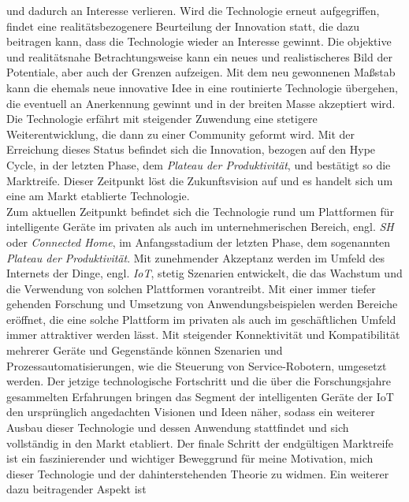     und dadurch an Interesse verlieren. Wird die Technologie erneut aufgegriffen, findet eine realitätsbezogenere 
    Beurteilung der Innovation statt, die dazu beitragen kann, dass die Technologie wieder an Interesse gewinnt. Die 
    objektive und realitätsnahe Betrachtungsweise kann ein neues und realistischeres Bild der Potentiale, aber auch 
    der Grenzen aufzeigen. Mit dem neu gewonnenen Maßstab kann die ehemals neue innovative Idee in eine routinierte Technologie übergehen, 
    die eventuell an Anerkennung gewinnt und in der breiten Masse akzeptiert wird. Die Technologie erfährt mit steigender 
    Zuwendung eine stetigere Weiterentwicklung, die dann zu einer Community geformt wird. Mit der Erreichung dieses Status 
    befindet sich die Innovation, bezogen auf den Hype Cycle, in der letzten Phase, dem \textit{Plateau der Produktivität}, 
    und bestätigt so die Marktreife. Dieser Zeitpunkt löst die Zukunftsvision auf und es handelt sich um eine am Markt 
    etablierte Technologie.
    \\ 
    \linebreak
    Zum aktuellen Zeitpunkt befindet sich die Technologie rund um Plattformen für intelligente Geräte im privaten als auch im unternehmerischen 
    Bereich, engl. \textit{\ac{SH}} oder \textit{Connected Home}, im Anfangsstadium der letzten Phase, dem sogenannten 
    \textit{Plateau der Produktivität}. Mit zunehmender Akzeptanz werden im Umfeld des Internets der Dinge, engl. 
    \textit{\acl{IoT}}, stetig Szenarien entwickelt, die das Wachstum und die Verwendung von solchen Plattformen vorantreibt. 
    Mit einer immer tiefer gehenden Forschung und Umsetzung von Anwendungsbeispielen werden Bereiche eröffnet, die 
    eine solche Plattform im privaten als auch im geschäftlichen Umfeld immer attraktiver werden lässt. Mit steigender  
    Konnektivität und Kompatibilität mehrerer Geräte und Gegenstände können Szenarien und Prozessautomatisierungen, wie die 
    Steuerung von Service-Robotern, umgesetzt werden. Der jetzige technologische Fortschritt und die über die Forschungsjahre 
    gesammelten Erfahrungen bringen das Segment der intelligenten Geräte der \acs{IoT} den ursprünglich angedachten 
    Visionen und Ideen näher, sodass ein weiterer Ausbau dieser Technologie und dessen Anwendung stattfindet und sich 
    vollständig in den Markt etabliert. Der finale Schritt der endgültigen Marktreife ist ein faszinierender und wichtiger Beweggrund 
    für meine Motivation, mich dieser Technologie und der dahinterstehenden Theorie zu widmen. Ein weiterer dazu beitragender Aspekt ist 
